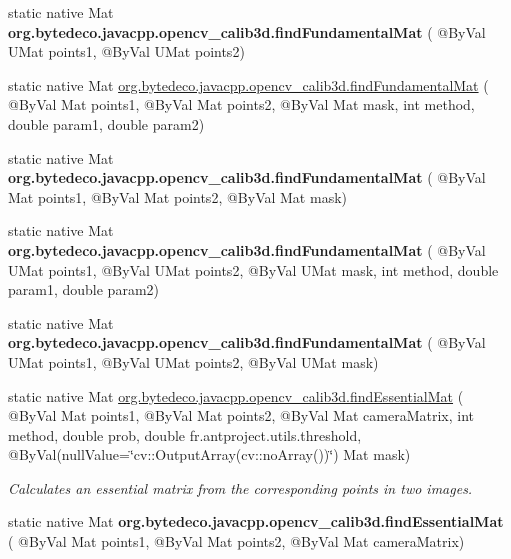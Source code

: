\begin{DoxyCompactItemize}
\item 
\mbox{\label{group__calib3d_ga517d13a724fcae1763cefba9174043d8}} 
static native Mat {\bfseries org.\+bytedeco.\+javacpp.\+opencv\+\_\+calib3d.\+find\+Fundamental\+Mat} ( @By\+Val U\+Mat points1, @By\+Val U\+Mat points2)
\item 
static native Mat \hyperlink{group__calib3d_ga1a8446757231db93d44c99331ac4747d}{org.\+bytedeco.\+javacpp.\+opencv\+\_\+calib3d.\+find\+Fundamental\+Mat} ( @By\+Val Mat points1, @By\+Val Mat points2, @By\+Val Mat mask, int method, double param1, double param2)
\item 
\mbox{\label{group__calib3d_ga0cc3d884d531ba56729389786e247e7e}} 
static native Mat {\bfseries org.\+bytedeco.\+javacpp.\+opencv\+\_\+calib3d.\+find\+Fundamental\+Mat} ( @By\+Val Mat points1, @By\+Val Mat points2, @By\+Val Mat mask)
\item 
\mbox{\label{group__calib3d_ga45d4b9b84de214ae9fe848ab74703306}} 
static native Mat {\bfseries org.\+bytedeco.\+javacpp.\+opencv\+\_\+calib3d.\+find\+Fundamental\+Mat} ( @By\+Val U\+Mat points1, @By\+Val U\+Mat points2, @By\+Val U\+Mat mask, int method, double param1, double param2)
\item 
\mbox{\label{group__calib3d_ga99252726cb03123a93d72e760517a9be}} 
static native Mat {\bfseries org.\+bytedeco.\+javacpp.\+opencv\+\_\+calib3d.\+find\+Fundamental\+Mat} ( @By\+Val U\+Mat points1, @By\+Val U\+Mat points2, @By\+Val U\+Mat mask)
\item 
static native Mat \hyperlink{group__calib3d_gad86954f592d1f99b0f8cdec7f4134c7a}{org.\+bytedeco.\+javacpp.\+opencv\+\_\+calib3d.\+find\+Essential\+Mat} ( @By\+Val Mat points1, @By\+Val Mat points2, @By\+Val Mat camera\+Matrix, int method, double prob, double fr.antproject.utils.threshold, @By\+Val(null\+Value=\char`\"{}cv\+::\+Output\+Array(cv\+::no\+Array())\char`\"{}) Mat mask)
\begin{DoxyCompactList}\small\item\em Calculates an essential matrix from the corresponding points in two images. \end{DoxyCompactList}\item 
\mbox{\label{group__calib3d_ga56ce323a1d0304739ef11e60f0a065e8}} 
static native Mat {\bfseries org.\+bytedeco.\+javacpp.\+opencv\+\_\+calib3d.\+find\+Essential\+Mat} ( @By\+Val Mat points1, @By\+Val Mat points2, @By\+Val Mat camera\+Matrix)

\end{DoxyCompactItemize}
